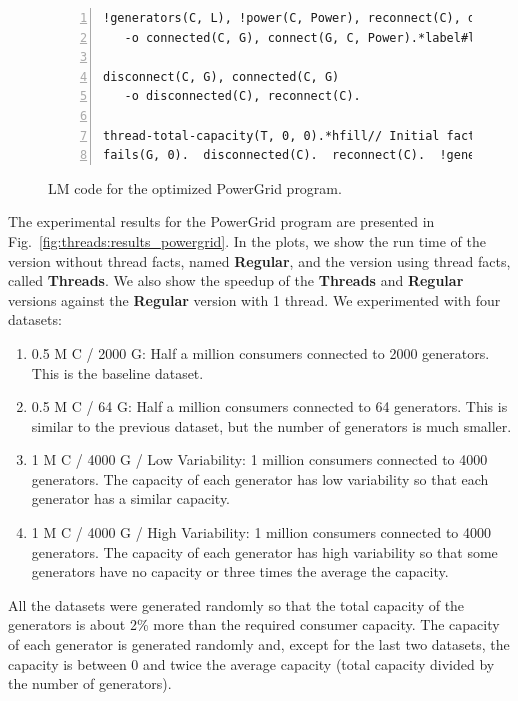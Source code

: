 \begin{figure}[h!]
\begin{Verbatim}[numbers=left,fontsize=\scriptsize,commandchars=*\#\&]
!generators(C, L), !power(C, Power), reconnect(C), disconnected(C), G = nth(L, randint(num-generators))*label#line:threads:pgt_conn1&
   -o connected(C, G), connect(G, C, Power).*label#line:threads:pgt_conn2&

disconnect(C, G), connected(C, G)
   -o disconnected(C), reconnect(C).

thread-total-capacity(T, 0, 0).*hfill// Initial facts
fails(G, 0).  disconnected(C).  reconnect(C).  !generators(C, all-generators).  start(G).
\end{Verbatim}
\caption{LM code for the optimized PowerGrid program.}
\label{code:threads:powergridt}
\end{figure}

The experimental results for the PowerGrid program are presented in
Fig.~\ref{fig:threads:results_powergrid}. In the plots, we show the run time of
the version without thread facts, named \textbf{Regular}, and the version using
thread facts, called \textbf{Threads}. We also show the speedup of the
\textbf{Threads} and \textbf{Regular} versions against the \textbf{Regular}
version with 1 thread.  We experimented with four datasets:

\begin{enumerate}
      \item 0.5 M C / 2000 G: Half a million consumers connected to 2000
         generators. This is the baseline dataset.

      \item 0.5 M C / 64 G: Half a million consumers connected to 64
         generators. This is similar to the previous dataset, but the number of
         generators is much smaller.

      \item 1 M C / 4000 G / Low Variability: 1 million consumers connected to
         4000 generators. The capacity of each generator has low variability so
         that each generator has a similar capacity.

      \item 1 M C / 4000 G / High Variability: 1 million consumers connected to
         4000 generators. The capacity of each generator has high variability so
         that some generators have no capacity or three times the average the
         capacity.

\end{enumerate}

All the datasets were generated randomly so that the total capacity of the
generators is about 2\% more than the required consumer capacity. The capacity
of each generator is generated randomly and, except for the last two datasets,
the capacity is between 0 and twice the average capacity (total capacity divided
by the number of generators).

